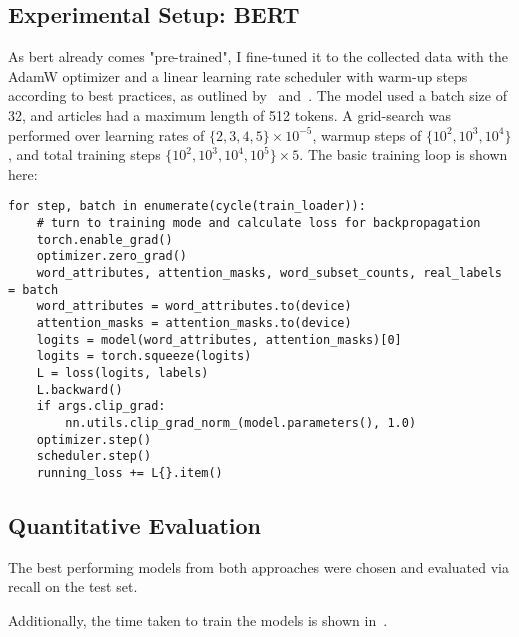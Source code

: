 \subsection{Experimental Setup: BERT}
As \acrshort{bert} already comes "pre-trained", I fine-tuned it to the collected data with the AdamW optimizer and a linear learning rate scheduler with warm-up steps according to best practices, as outlined by~\textcite{devlin2019bert:} and~\textcite{wolf2019huggingfaces}. The model used a batch size of 32, and articles had a maximum length of 512 tokens. A grid-search was performed over learning rates of $\{2, 3, 4, 5\} \times 10^{-5}$, warmup steps of $\{10^2, 10^3, 10^4\}$, and total training steps $\{10^2, 10^3, 10^4, 10^5\} \times 5$. The basic training loop is shown here:
\begin{verbatim}
for step, batch in enumerate(cycle(train_loader)):
    # turn to training mode and calculate loss for backpropagation
    torch.enable_grad()
    optimizer.zero_grad()
    word_attributes, attention_masks, word_subset_counts, real_labels = batch
    word_attributes = word_attributes.to(device)
    attention_masks = attention_masks.to(device)
    logits = model(word_attributes, attention_masks)[0]
    logits = torch.squeeze(logits)
    L = loss(logits, labels)
    L.backward()
    if args.clip_grad:
        nn.utils.clip_grad_norm_(model.parameters(), 1.0)
    optimizer.step()
    scheduler.step()
    running_loss += L{}.item()
\end{verbatim}

\subsection{Quantitative Evaluation}
The best performing models from both approaches were chosen and evaluated via recall on the test set.


Additionally, the time taken to train the models is shown in~.

